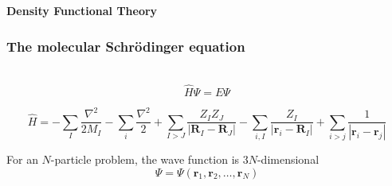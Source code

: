 
\begin{frame}
    \centering
    \textbf{\Large{Density Functional Theory}}
\end{frame}

\begin{frame}
    \frametitle{The molecular Schr\"{o}dinger equation}
    \ \\
    {\large
    \begin{equation}
	\nonumber
	\hat{H}\Psi = E\Psi
    \end{equation}
    }

    \begin{equation}
	\nonumber
	\hat{H} =
        - \sum_I \frac{\nabla^2}{2M_I} - \sum_i \frac{\nabla^2}{2}
	+ \sum_{I>J} \frac{Z_IZ_J}{|\boldsymbol{R}_I-\boldsymbol{R}_J|} 
	- \sum_{i,I} \frac{Z_I}{|\boldsymbol{r}_i-\boldsymbol{R}_I|} 
	+ \sum_{i>j} \frac{1}{|\boldsymbol{r}_i-\boldsymbol{r}_j|} 
    \end{equation}

    \vspace{5mm}

    \centering
    For an $N$-particle problem, the wave function is $3N$-dimensional
    \begin{equation}
	\nonumber
	\Psi = \Psi(\boldsymbol{r}_1,\boldsymbol{r}_2,\dots,\boldsymbol{r}_N)
    \end{equation}

    \vspace{5mm}


\end{frame}
